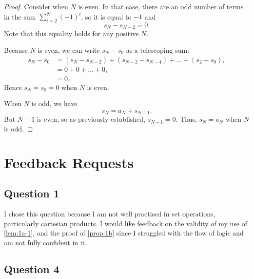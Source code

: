 \begin{enumerate}
\begin{enumerate}
\begin{proof}
                    Consider when $N$ is even.
                    In that case, there are an odd number of terms in the sum $\sum_{i = 2}^N (-1)^i$, so it is equal to $-1$ and
                    \[ s_N - s_{N - 2} = 0. \]
                    Note that this equality holds for any positive $N$.

                    Because $N$ is even, we can write $s_N - s_0$ as a telescoping sum:
                    \begin{align*}
                        s_N - s_0 &= (s_N - s_{N - 2}) + (s_{N - 2} - s_{N - 4}) + \ldots + (s_2 - s_0), \\
                        &= 0 + 0 + \ldots + 0, \\
                        &= 0.
                    \end{align*}
                    Hence $s_N = s_0 = 0$ when $N$ is even.

                    \smallskip

                    When $N$ is odd, we have
                    \[ s_N = a_N + s_{N - 1}. \]
                    But $N - 1$ is even, so as previously established, $s_{N - 1} = 0$.
                    Thus, $s_N = a_N$ when $N$ is odd.
                \end{proof}

        \end{enumerate}

\end{enumerate}

\pagebreak

\section*{Feedback Requests}

\subsection*{Question 1}

I chose this question because I am not well practised in set operations, particularly cartesian products.
I would like feedback on the validity of my use of \cref{lem:1a-1}, and the proof of \cref{prop:1b} since I struggled with the flow of logic and am not fully confident in it.

\subsection*{Question 4}


